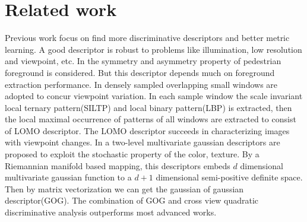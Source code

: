 \documentclass[conference,compsoc]{IEEEtran}
\begin{document}
\section{Related work}
Previous work focus on find more discriminative descriptors and better metric learning. A good descriptor is robust to problems like illumination, low resolution and viewpoint, etc. In \cite{SDALF} the symmetry and asymmetry property of pedestrian foreground is considered. But this descriptor depends much on foreground extraction performance. In \cite{LOMO} densely sampled overlapping small windows are adopted to concur viewpoint variation. In each sample window the scale invariant local ternary pattern(SILTP) and local binary pattern(LBP) is extracted, then the local maximal occurrence of patterns of all windows are extracted to consist of LOMO descriptor. The LOMO descriptor succeeds in characterizing images with viewpoint changes. In \cite{GOG} a two-level multivariate gaussian descriptors are proposed to exploit the stochastic property of the color, texture. By a Riemannian manifold based mapping, this descriptors embeds $d$ dimensional multivariate gaussian function to a $d+1$ dimensional semi-positive definite space. Then by matrix vectorization we can get the gaussian of gaussian descriptor(GOG). The combination of GOG and cross view quadratic discriminative analysis outperforms most advanced works.
\end{document}

